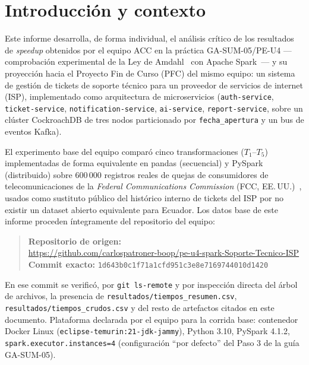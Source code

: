 \documentclass[11pt,a4paper]{article}
\begin{document}
\section{Introducción y contexto}

Este informe desarrolla, de forma individual, el análisis crítico de los resultados de
\emph{speedup} obtenidos por el equipo ACC en la práctica GA-SUM-05/PE-U4 ---comprobación
experimental de la Ley de Amdahl~\cite{amdahl1967validity} con Apache
Spark~\cite{zaharia2016apache}--- y su proyección hacia el Proyecto Fin de Curso (PFC) del
mismo equipo: un sistema de gestión de tickets de soporte técnico para un proveedor de
servicios de internet (ISP), implementado como arquitectura de microservicios (\texttt{auth-service},
\texttt{ticket-service}, \texttt{notification-service}, \texttt{ai-service}, \texttt{report-service},
sobre un clúster CockroachDB de tres nodos particionado por \texttt{fecha\_apertura} y un
bus de eventos Kafka).

El experimento base del equipo comparó cinco transformaciones (\(T_1\)--\(T_5\)) implementadas
de forma equivalente en pandas (secuencial) y PySpark (distribuido) sobre 600\,000 registros
reales de quejas de consumidores de telecomunicaciones de la \emph{Federal Communications
Commission} (FCC, EE.\,UU.)~\cite{fcc2026complaints}, usados como sustituto público del
histórico interno de tickets del ISP por no existir un dataset abierto equivalente para
Ecuador. Los datos base de este informe proceden íntegramente del repositorio del equipo:

\begin{quote}
\textbf{Repositorio de origen:}\\
\url{https://github.com/carlospatroner-boop/pe-u4-spark-Soporte-Tecnico-ISP}\\[4pt]
\textbf{Commit exacto:} \texttt{1d643b0c1f71a1cfd951c3e8e7169744010d1420}
\end{quote}

En ese commit se verificó, por \texttt{git ls-remote} y por inspección directa del árbol de
archivos, la presencia de \texttt{resultados/tiempos\_resumen.csv},
\texttt{resultados/tiempos\_crudos.csv} y del resto de artefactos citados en este documento.
Plataforma declarada por el equipo para la corrida base: contenedor Docker Linux
(\texttt{eclipse-temurin:21-jdk-jammy}), Python 3.10, PySpark 4.1.2, \texttt{spark.executor.instances=4}
(configuración ``por defecto'' del Paso 3 de la guía GA-SUM-05).
\end{document}
